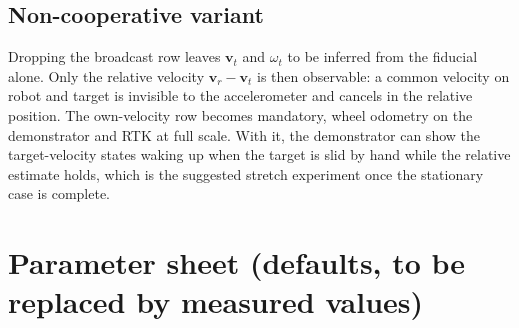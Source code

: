 \documentclass[11pt,a4paper]{article}
\newcommand{\vect}[1]{\bm{#1}}
\begin{document}
\subsection{Non-cooperative variant}
\label{sec:noncoop}
Dropping the broadcast row leaves $\vect v_t$ and $\omega_t$ to be inferred from the fiducial alone. Only the relative velocity $\vect v_r - \vect v_t$ is then observable: a common velocity on robot and target is invisible to the accelerometer and cancels in the relative position. The own-velocity row becomes mandatory, wheel odometry on the demonstrator and RTK at full scale. With it, the demonstrator can show the target-velocity states waking up when the target is slid by hand while the relative estimate holds, which is the suggested stretch experiment once the stationary case is complete.

\section{Parameter sheet (defaults, to be replaced by measured values)}
\end{document}
